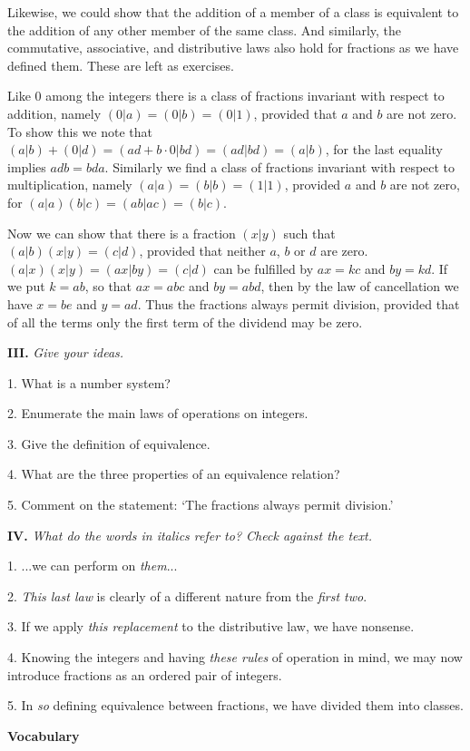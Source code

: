 \documentclass[a4paper]{article}
\newcommand{\ESect}[1]{\medskip\par{\large \textbf{#1}}\par}
\newcommand{\ETask}[2]{\medskip\par\textbf{#1.} \textit{#2}\par}
\begin{document}
Likewise, we could show that the addition of a member of a class is equivalent to the addition of any other member of the
same class. And similarly, the commutative, associative, and distributive laws also hold for fractions as we have defined them.
These are left as exercises.

Like 0 among the integers there is a class of fractions invariant with respect to addition, namely $(0|a)=(0|b)=(0|1)$,
provided that $a$ and $b$ are not zero. To show this we note that $(a|b)+(0|d)=(ad+b\cdot 0|bd)=(ad|bd)=(a|b)$, for the last
equality implies $adb = bda$. Similarly we find a class of fractions invariant with respect to multiplication, namely
$(a|a)=(b|b)=(1|1)$, provided $a$ and $b$ are not zero, for $(a|a)(b|c)=(ab|ac)=(b|c)$.

Now we can show that there is a fraction $(x|y)$ such that $(a|b)(x|y)=(c|d)$, provided that neither $a$, $b$ or $d$ are zero.
$(a|x)(x|y)=(ax|by)=(c|d)$ can be fulfilled by $ax=kc$ and $by=kd$. If we put $k=ab$, so that $ax=abc$ and $by=abd$, then
by the law of cancellation we have $x=be$ and $y=ad$. Thus the fractions always permit division, provided that of all the terms
only the first term of the dividend may be zero.

\ETask{III}{Give your ideas.}

1. What is a number system?

2. Enumerate the main laws of operations on integers.

3. Give the definition of equivalence.

4. What are the three properties of an equivalence relation?

5. Comment on the statement: `The fractions always permit division.'

\ETask{IV}{What do the words in italics refer to? Check against the text.}

1. ...we can perform on \textit{them}...

2. \textit{This last law} is clearly of a different nature from the \textit{first two}.

3. If we apply \textit{this replacement} to the distributive law, we have nonsense.

4. Knowing the integers and having \textit{these rules} of operation in mind, we may now introduce fractions as
an ordered pair of integers.

5. In \textit{so} defining equivalence between fractions, we have divided them into classes.

\ESect{Vocabulary}
\end{document}
